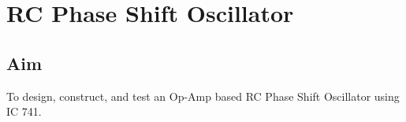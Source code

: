 
\chapter{RC Phase Shift Oscillator}

\section{Aim}
To design, construct, and test an Op-Amp based RC Phase Shift Oscillator using IC 741. %

